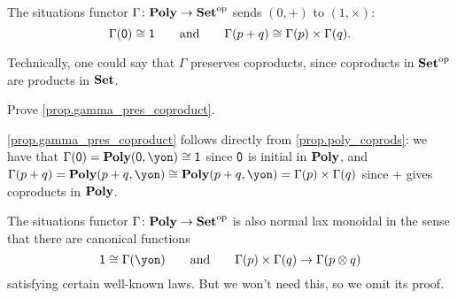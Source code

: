 \documentclass[Book-Poly]{subfiles}
\begin{document}
\begin{proposition}\label{prop.gamma_pres_coproduct}
The situations functor $\Gamma\colon\mathbf{Poly}\to\mathbf{Set}^{\textnormal{op}}$ sends $(0,+)$ to $(1,\times)$:
\[
	\Gamma(\textsf{0})\cong\textsf{1}
	\qquad\text{and}\qquad
	\Gamma(p+q)\cong\Gamma(p)\times\Gamma(q).
\]
\end{proposition}
Technically, one could say that $\Gamma$ preserves coproducts, since coproducts in $\mathbf{Set}^{\textnormal{op}}$ are products in $\mathbf{Set}$.

\begin{exercise}
Prove \cref{prop.gamma_pres_coproduct}.
\begin{solution}
\cref{prop.gamma_pres_coproduct} follows directly from \cref{prop.poly_coprods}: we have that $\Gamma(\0) = \poly(\0,\yon) \iso \1$ since $\textsf{0}$ is initial in $\mathbf{Poly}$, and $\Gamma(p + q) = \poly(p+q,\yon) \iso \poly(p+q,\yon) = \Gamma(p) \times \Gamma(q)$ since $+$ gives coproducts in $\mathbf{Poly}$. 
\end{solution}
\end{exercise}

\begin{remark}
The situations functor $\Gamma\colon\mathbf{Poly}\to\mathbf{Set}^{\textnormal{op}}$ is also normal lax monoidal in the sense that there are canonical functions
\[
	\1\cong\Gamma(\yon)
	\qqand
	\Gamma(p)\times\Gamma(q)\to\Gamma(p\otimes q)
\]
satisfying certain well-known laws. But we won't need this, so we omit its proof.
\end{remark}


\end{document}
